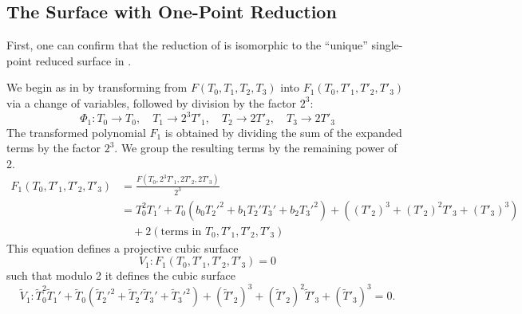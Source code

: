 \documentclass[11pt]{article}
\theoremstyle{definition}
\begin{document}
\subsection{The Surface with One-Point Reduction}
\label{sec:trans}

First, one can confirm that the reduction of  is isomorphic to the ``unique'' single-point reduced surface in \cite[5.5]{swinnertondyer}.

We begin as in \cite[\S 3.1]{dimitrikanevsky} by transforming  from $F(T_0, T_1, T_2, T_3)$ into $F_1(T_0, T'_1, T'_2, T'_3)$ via a change of variables, followed by division by the factor $2^{3}$:
\begin{equation}
\label{psi}
\Phi_1:    T_0 \to T_0, \quad T_1 \to 2^{3}T'_1, \quad T_2 \to 2T'_2, \quad T_3 \to 2T'_3
\end{equation}
The transformed polynomial $F_1$ is obtained by dividing the sum of the expanded terms by the factor $2^3$. We group the resulting terms by the remaining power of 2.
\begin{align}
F_1(T_0, T'_1, T'_2, T'_3) &= \frac{F(T_0, 2^{3}T'_1, 2T'_2, 2T'_3)}{2^{3}} \nonumber\\
&= T_0^2T_1' + T_0(b_0T_2'^2+b_1T_2'T_3' + b_2  T_3'^2) + \left((T'_2)^3 + (T'_2)^2T'_3 + (T'_3)^3\right) \nonumber\\ 
&\quad + 2 ( \text{terms in } T_0, T'_1, T'_2, T'_3 )
\label{Fm}
\end{align}
This equation defines a projective cubic surface 
\begin{equation}
\label{V1}
V_1: F_1(T_0, T'_1, T'_2, T'_3)=0
\end{equation}
such that modulo 2 it defines the cubic surface
\begin{equation}
\label{eq:v1}
\tilde V_1:  \tilde T_0^2 \tilde T_1' + \tilde T_0(\tilde T_2'^2+\tilde T_2'\tilde T_3' +   \tilde T_3'^2) + (\tilde T'_2)^3 + (\tilde T'_2)^2\tilde T'_3 + (\tilde T'_3)^3 = 0.
\end{equation}
\end{document}
